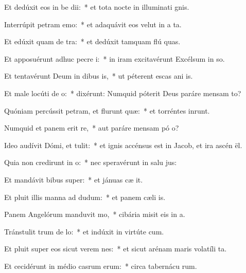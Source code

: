 \item Et dedúxit eos in be dii:~* et tota nocte in illuminati gnis.
\item Interrúpit petram  emo:~* et adaquávit eos velut in a ta.
\item Et edúxit quam de tra:~* et dedúxit tamquam flú quas.
\item Et apposuérunt adhuc pecre i:~* in iram excitavérunt Excélsum in so.
\item Et tentavérunt Deum in dibus is,~* ut péterent escas ani is.
\item Et male locúti  de o:~* dixérunt: Numquid póterit Deus paráre mensam  to?
\item Quóniam percússit petram, et flurunt quæ:~* et torréntes inrunt.
\item Numquid et panem erit re,~* aut paráre mensam pó o?
\item Ideo audívit Dómi, et tulit:~* et ignis accénsus est in Jacob, et ira ascén  ël.
\item Quia non credirunt in o:~* nec speravérunt in salu jus:
\item Et mandávit bibus super:~* et jánuas cæ it.
\item Et pluit illis manna ad dudum:~* et panem cæli  is.
\item Panem Angelórum manduvit mo,~* cibária misit eis in a.
\item Tránstulit trum de lo:~* et indúxit in virtúte  cum.
\item Et pluit super eos sicut verem nes:~* et sicut arénam maris volatíli ta.
\item Et cecidérunt in médio casrum erum:~* circa tabernácu rum.
